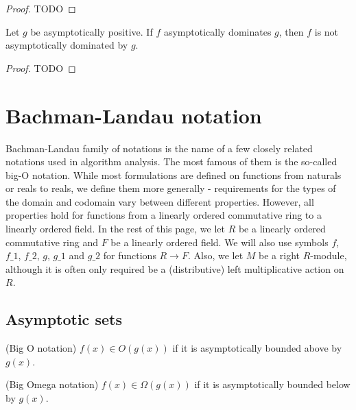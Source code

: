 \begin{proof}
    TODO 
\end{proof}

\begin{theorem}
    \label{thm:not_asymp_pos_right_dom_of_left_dom}
    \leanok
    Let $g$ be asymptotically positive. If $f$ asymptotically dominates $g$, then
    $f$ is not asymptotically dominated by $g$.
\end{theorem}

\begin{proof}
    TODO 
\end{proof}
\section{Bachman-Landau notation}

Bachman-Landau family of notations is the name of a few closely related notations used in 
algorithm analysis. The most famous of them is the so-called big-O notation. While
most formulations are defined on functions from naturals or reals to reals, we define 
them more generally - requirements for the types of the domain and codomain vary between 
different properties. However, all properties hold for functions from a linearly ordered 
commutative ring to a linearly ordered field. In the rest of this page, we let $R$ be a linearly 
ordered commutative ring and $F$ be a linearly ordered field. We will also use symbols $f$, 
$f\_1$, $f\_2$, $g$, $g\_1$ and $g\_2$ for functions $R \to F$. Also, we let $M$ be 
a right $R$-module, although it is often only required be a (distributive) left multiplicative 
action on $R$.


\subsection{Asymptotic sets}

\begin{definition}(Big O notation)
    \label{def:big_o}
    \leanok
    $f(x) \in O(g(x))$ if it is asymptotically bounded above by $g(x)$.
\end{definition}

\begin{definition}(Big Omega notation)
    \label{def:big_omega}
    \leanok
    $f(x) \in \Omega(g(x))$ if it is asymptotically bounded below by $g(x)$.
\end{definition}

